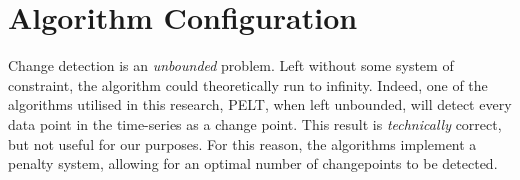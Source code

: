 \documentclass{uvamscse}	%
\begin{document}
%
%
%
%

\section{Algorithm Configuration}

Change detection is an \emph{unbounded} problem. Left without some system of constraint, the algorithm could theoretically run to infinity. Indeed, one of the algorithms utilised in this research, PELT, when left unbounded, will detect every data point in the time-series as a change point. This result is \textit{technically} correct, but not useful for our purposes. For this reason, the algorithms implement a penalty system, allowing for an optimal number of changepoints to be detected.
\end{document}
